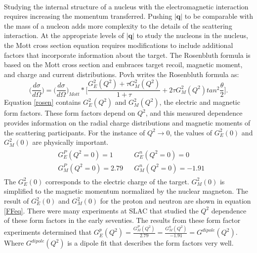 \paragraph{} Studying the internal structure of a nucleus with the electromagnetic interaction requires increasing the momentum transferred. Pushing $|\boldsymbol{q}|$ to be comparable with the mass of a nucleon adds more complexity to the details of the scattering interaction. At the appropriate levels of $|\boldsymbol{q}|$ to study the nucleons in the nucleus, the Mott cross section equation requires modifications to include additional factors that incorporate information about the target. The Rosenbluth formula is based on the Mott cross section and embraces target recoil, magnetic moment, and charge and current distributions. Povh writes the Rosenbluth formula as:
\begin{equation}
\label{rosen}
\bigg(\frac{d\sigma}{d\Omega}\bigg)=\bigg(\frac{d\sigma}{d\Omega}\bigg)_{Mott} *\bigg\lbrack \frac{G^2_E(Q^2) +\tau G^2_M(Q^2)}{1+\tau} + 2\tau G^2_M(Q^2)tan^2\frac{\theta}{2} \bigg\rbrack.
\end{equation}
Equation \ref{rosen} contains $G^2_E(Q^2)$ and $G^2_M(Q^2)$, the electric and magnetic form factors. These form factors depend on $Q^2$, and this measured dependence provides information on the radial charge distributions and magnetic moments of the scattering participants. For the instance of $Q^2 \rightarrow 0$, the values of  $G^2_E(0)$ and $G^2_M(0)$ are physically important.
\begin{align}
	\begin{split}
		&G^P_E(Q^2=0) = 1 \\
		&G^P_M(Q^2=0) = 2.79
	\end{split}
	\begin{split}
	    &G^n_E(Q^2=0) = 0 \\
	    &G^n_M(Q^2=0) = -1.91 \label{FFeq}
	\end{split}
\end{align}
The $G^2_E(0)$ corresponds to the electric charge of the target. $G^2_M(0)$ is simplified to the magnetic momentum normalized by the nuclear magneton. The result of $G^2_E(0)$ and $G^2_M(0)$ for the proton and neutron are shown in equation \ref{FFeq}\cite{PnN}. There were many experiments at SLAC that studied the $Q^2$ dependence of these form factors in the early seventies. The results from these form factor experiments determined that $G^p_E(Q^2) = \frac{G^P_M(Q^2)}{2.79} = \frac{G^n_M(Q^2)}{-1.91} = G^{dipole}(Q^2)$. Where $G^{dipole}(Q^2)$ is a dipole fit that describes the form factors very well\cite{PnN}.

